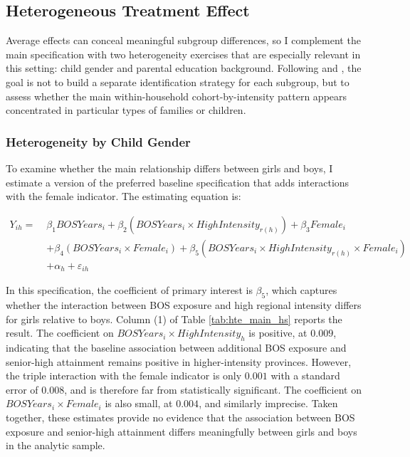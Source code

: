 \documentclass[a4paper, 12pt]{article}
\begin{document}
\begin{doublespacing}
\clearpage
\begin{landscape}
    
\end{landscape}
\clearpage

\subsection{Heterogeneous Treatment Effect}
Average effects can conceal meaningful subgroup differences, so I complement the main specification with two heterogeneity exercises that are especially relevant in this setting: child gender and parental education background. Following \citet{BitlerGelbachHoynes2006} and \citet{LehrerPohlSong2016}, the goal is not to build a separate identification strategy for each subgroup, but to assess whether the main within-household cohort-by-intensity pattern appears concentrated in particular types of families or children.

\subsubsection{Heterogeneity by Child Gender}
To examine whether the main relationship differs between girls and boys, I estimate a version of the preferred baseline specification that adds interactions with the female indicator. The estimating equation is:

\begin{equation}
\begin{aligned}
Y_{ih} =\;& \beta_{1} BOSYears_{i}
+ \beta_{2} \left(BOSYears_{i} \times HighIntensity_{r(h)}\right)
+ \beta_{3} Female_{i} \\
&+ \beta_{4} \left(BOSYears_{i} \times Female_{i}\right)
+ \beta_{5} \left(BOSYears_{i} \times HighIntensity_{r(h)} \times Female_{i}\right) \\
&+ \alpha_{h} + \varepsilon_{ih}
\end{aligned}
\end{equation}

In this specification, the coefficient of primary interest is $\beta_{5}$, which captures whether the interaction between BOS exposure and high regional intensity differs for girls relative to boys. Column (1) of Table \ref{tab:hte_main_hs} reports the result. The coefficient on $BOSYears_{i} \times HighIntensity_{h}$ is positive, at $0.009$, indicating that the baseline association between additional BOS exposure and senior-high attainment remains positive in higher-intensity provinces. However, the triple interaction with the female indicator is only $0.001$ with a standard error of $0.008$, and is therefore far from statistically significant. The coefficient on $BOSYears_{i} \times Female_{i}$ is also small, at $0.004$, and similarly imprecise. Taken together, these estimates provide no evidence that the association between BOS exposure and senior-high attainment differs meaningfully between girls and boys in the analytic sample.


\end{doublespacing}
\end{document}
